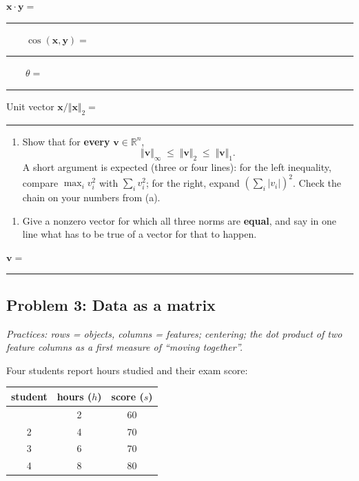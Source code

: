 \documentclass[
  11pt,
]{article}
\newcounter{none} %
\providecommand{\tightlist}{%
  \setlength{\itemsep}{0pt}\setlength{\parskip}{0pt}}
\newcommand{\answerspace}[1]{\par\vspace*{#1}}  %
\newcommand{\blank}[1][1.2in]{\rule{#1}{0.4pt}}
\newcommand{\answerpage}{\clearpage}
\begin{document}
\(\mathbf{x}\cdot\mathbf{y} =\)
\blank[0.8in] \(\qquad \cos(\mathbf{x},\mathbf{y}) =\)
\blank[0.8in] \(\qquad \theta =\) \blank[1.4in]

Unit vector \(\mathbf{x}/\Vert\mathbf{x}\Vert_2 =\) \blank[1.6in]

\answerspace{2in}

\begin{enumerate}
\def\labelenumi{(\alph{enumi})}
\setcounter{enumi}{2}
\tightlist
\item
  Show that for \textbf{every} \(\mathbf{v}\in\mathbb{R}^n\),
  \[\Vert\mathbf{v}\Vert_\infty \;\le\; \Vert\mathbf{v}\Vert_2 \;\le\; \Vert\mathbf{v}\Vert_1 .\]
  A short argument is expected (three or four lines): for the left
  inequality, compare \(\max_i v_i^2\) with \(\sum_i v_i^2\); for the
  right, expand \((\sum_i |v_i|)^2\). Check the chain on your numbers
  from (a).
\end{enumerate}

\answerspace{2.8in}

\begin{enumerate}
\def\labelenumi{(\alph{enumi})}
\setcounter{enumi}{3}
\tightlist
\item
  Give a nonzero vector for which all three norms are \textbf{equal},
  and say in one line what has to be true of a vector for that to
  happen.
\end{enumerate}

\(\mathbf{v} =\) \blank[1.4in]

\answerspace{1in}

\answerpage

\subsection{Problem 3: Data as a
matrix}\label{problem-3-data-as-a-matrix}

\emph{Practices: rows = objects, columns = features; centering; the dot
product of two feature columns as a first measure of ``moving
together''.}

Four students report hours studied and their exam score:

{\def\LTcaptype{none} %
\begin{longtable}[]{@{}ccc@{}}
\toprule\noalign{}
student & hours (\(h\)) & score (\(s\)) \\
\midrule\noalign{}
\endhead
\bottomrule\noalign{}
\endlastfoot
1 & 2 & 60 \\
2 & 4 & 70 \\
3 & 6 & 70 \\
4 & 8 & 80 \\
\end{longtable}
}
\end{document}
